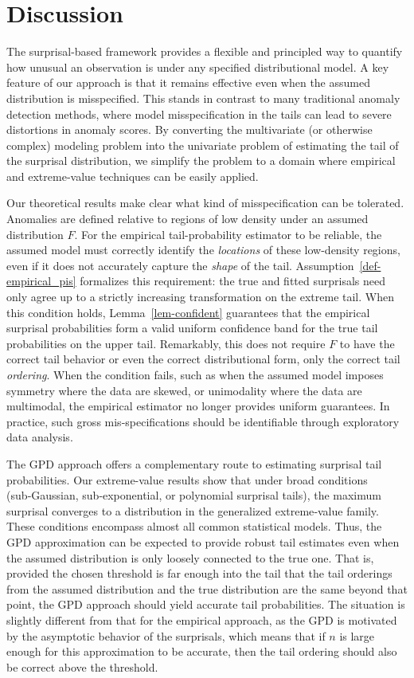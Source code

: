 \documentclass[
  12pt]{article}
\theoremstyle{plain}
\theoremstyle{plain}
\theoremstyle{definition}
\theoremstyle{plain}
\theoremstyle{remark}
\begin{document}
\section{Discussion}\label{sec-discussion}

The surprisal-based framework provides a flexible and principled way to
quantify how unusual an observation is under any specified
distributional model. A key feature of our approach is that it remains
effective even when the assumed distribution is misspecified. This
stands in contrast to many traditional anomaly detection methods, where
model misspecification in the tails can lead to severe distortions in
anomaly scores. By converting the multivariate (or otherwise complex)
modeling problem into the univariate problem of estimating the tail of
the surprisal distribution, we simplify the problem to a domain where
empirical and extreme‑value techniques can be easily applied.

Our theoretical results make clear what kind of misspecification can be
tolerated. Anomalies are defined relative to regions of low density
under an assumed distribution \(F\). For the empirical tail-probability
estimator to be reliable, the assumed model must correctly identify the
\emph{locations} of these low-density regions, even if it does not
accurately capture the \emph{shape} of the tail.
Assumption~\ref{def-empirical_pis} formalizes this requirement: the true
and fitted surprisals need only agree up to a strictly increasing
transformation on the extreme tail. When this condition holds,
Lemma~\ref{lem-confident} guarantees that the empirical surprisal
probabilities form a valid uniform confidence band for the true tail
probabilities on the upper tail. Remarkably, this does not require \(F\)
to have the correct tail behavior or even the correct distributional
form, only the correct tail \emph{ordering}. When the condition fails,
such as when the assumed model imposes symmetry where the data are
skewed, or unimodality where the data are multimodal, the empirical
estimator no longer provides uniform guarantees. In practice, such gross
mis-specifications should be identifiable through exploratory data
analysis.

The GPD approach offers a complementary route to estimating surprisal
tail probabilities. Our extreme-value results show that under broad
conditions (sub‑Gaussian, sub‑exponential, or polynomial surprisal
tails), the maximum surprisal converges to a distribution in the
generalized extreme‑value family. These conditions encompass almost all
common statistical models. Thus, the GPD approximation can be expected
to provide robust tail estimates even when the assumed distribution is
only loosely connected to the true one. That is, provided the chosen
threshold is far enough into the tail that the tail orderings from the
assumed distribution and the true distribution are the same beyond that
point, the GPD approach should yield accurate tail probabilities. The
situation is slightly different from that for the empirical approach, as
the GPD is motivated by the asymptotic behavior of the surprisals, which
means that if \(n\) is large enough for this approximation to be
accurate, then the tail ordering should also be correct above the
threshold.
\end{document}
